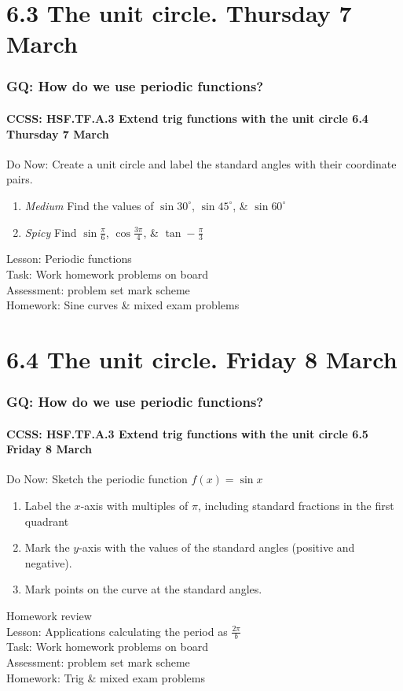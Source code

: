 \documentclass{beamer}
\begin{document}
\section{6.3 The unit circle. Thursday 7 March}
  \frame
  {
    \frametitle{GQ: How do we use periodic functions?}
    \framesubtitle{CCSS: HSF.TF.A.3 Extend trig functions with the unit circle  \hfill \alert{6.4 Thursday 7 March}}

      \begin{block}{Do Now: Create a unit circle and label the standard angles with their coordinate pairs.}
        \begin{enumerate}
            \item \emph{Medium} Find the values of $\sin 30^\circ$, $\sin 45^\circ$, \& $\sin 60^\circ$
            \item \emph{Spicy} Find $\sin \frac{\pi}{6}$, $\cos \frac{3\pi}{4}$, \& $\tan -\frac{\pi}{3}$
        \end{enumerate}
      \end{block}
    Lesson: Periodic functions\\%
    Task: Work homework problems on board\\%
    Assessment: problem set mark scheme\\%
    Homework: Sine curves \& mixed exam problems
  }


\section{6.4 The unit circle. Friday 8 March}
  \frame
  {
    \frametitle{GQ: How do we use periodic functions?}
    \framesubtitle{CCSS: HSF.TF.A.3 Extend trig functions with the unit circle  \hfill \alert{6.5 Friday 8 March}}

    \begin{block}{Do Now: Sketch the periodic function $f(x)=\sin{x}$}
      \begin{enumerate}
      \item Label the $x$-axis with multiples of $\pi$, including standard fractions in the first quadrant
      \item Mark the $y$-axis with the values of the standard angles (positive and negative).
      \item Mark points on the curve at the standard angles.
      \end{enumerate}
   \end{block}
    Homework review\\[5pt]
    Lesson: Applications calculating the period as $\frac{2\pi}{b}$\\%
    Task: Work homework problems on board\\%
    Assessment: problem set mark scheme\\%
    Homework: Trig \& mixed exam problems
  }
\end{document}
